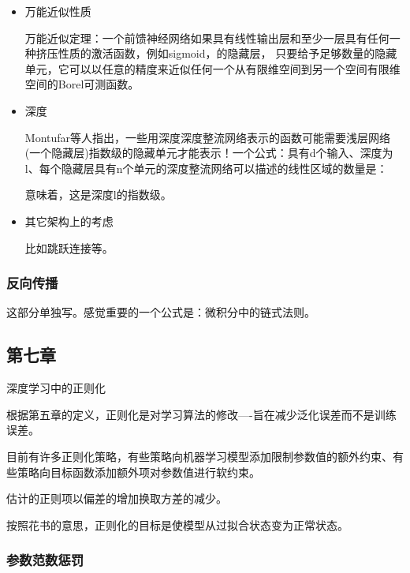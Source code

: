 \begin{itemize}
\item 万能近似性质

万能近似定理：一个前馈神经网络如果具有线性输出层和至少一层具有任何一种挤压性质的激活函数，例如sigmoid，的隐藏层， 只要给予足够数量的隐藏单元，它可以以任意的精度来近似任何一个从有限维空间到另一个空间有限维空间的Borel可测函数。

\item 深度

Montufar等人指出，一些用深度深度整流网络表示的函数可能需要浅层网络(一个隐藏层)指数级的隐藏单元才能表示！一个公式：具有d个输入、深度为l、每个隐藏层具有n个单元的深度整流网络可以描述的线性区域的数量是：

%

意味着，这是深度l的指数级。

\item 其它架构上的考虑

比如跳跃连接等。

\end{itemize}

\subsubsection{反向传播}

这部分单独写。感觉重要的一个公式是：微积分中的链式法则。

\subsection{第七章}

深度学习中的正则化

根据第五章的定义，正则化是对学习算法的修改----旨在减少泛化误差而不是训练误差。

目前有许多正则化策略，有些策略向机器学习模型添加限制参数值的额外约束、有些策略向目标函数添加额外项对参数值进行软约束。

估计的正则项以偏差的增加换取方差的减少。

按照花书的意思，正则化的目标是使模型从过拟合状态变为正常状态。

\subsubsection{参数范数惩罚}

